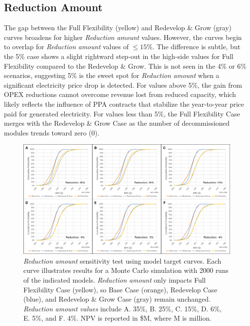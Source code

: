 \subsection{Reduction Amount}
\label{ch6:sens_redamt}

The gap between the Full Flexibility (yellow) and Redevelop \& Grow (gray) curves broadens for higher \textit{Reduction amount} values. However, the curves begin to overlap for \textit{Reduction amount} values of $\leq{15}\%$. The difference is subtle, but the 5\% case shows a slight rightward step-out in the high-side values for Full Flexibility compared to the Redevelop \& Grow. This is not seen in the 4\% or 6\% scenarios, suggesting 5\% is the sweet spot for \textit{Reduction amount} when a significant electricity price drop is detected. For values above 5\%, the gain from OPEX reductions cannot overcome revenue lost from reduced capacity, which likely reflects the influence of PPA contracts that stabilize the year-to-year price paid for generated electricity. For values less than 5\%, the Full Flexibility Case merges with the Redevelop \& Grow Case as the number of decommissioned modules trends toward zero (0).

\begin{figure}[!htp]
\centering
\includegraphics[width=.98\textwidth]{templates/images/Figure-Sensitivity_Reduction.pdf.png}
\caption[Reduction Amount sensitivity test]{\textit{Reduction amount} sensitivity test using model target curves. Each curve illustrates results for a Monte Carlo simulation with 2000 runs of the indicated models. \textit{Reduction amount} only impacts Full Flexibility Case (yellow), so Base Case (orange), Redevelop Case (blue), and Redevelop \& Grow Case (gray) remain unchanged. \textit{Reduction amount values} include A. 35\%, B. 25\%, C. 15\%, D. 6\%, E. 5\%, and F. 4\%. NPV is reported in \$M, where M is million.}
\label{fig:sens_test_reduction}
\end{figure}

